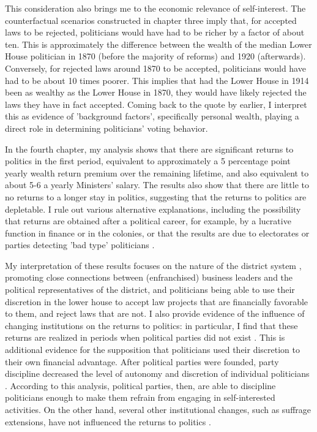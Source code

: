 This consideration also brings me to the economic relevance of self-interest. The counterfactual scenarios constructed in chapter three imply that, for accepted laws to be rejected, politicians would have had to be richer by a factor of about ten. This is approximately the difference between the wealth of the median Lower House politician in 1870 (before the majority of reforms) and 1920 (afterwards). Conversely, for rejected laws around 1870 to be accepted, politicians would have had to be about 10 times poorer. This implies that had the Lower House in 1914 been as wealthy as the Lower House in 1870, they would have likely rejected the laws they have in fact accepted. Coming back to the quote by \cite{van1983toegang} earlier, I interpret this as evidence of 'background factors', specifically personal wealth, playing a direct role in determining politicians' voting behavior. 

In the fourth chapter, my analysis shows that there are significant returns to politics in the first period, equivalent to approximately a 5 percentage point yearly wealth return premium over the remaining lifetime, and also equivalent to about 5-6 a yearly Ministers' salary. The results also show that there are little to no returns to a longer stay in politics, suggesting that the returns to politics are depletable. I rule out various alternative explanations, including the possibility that returns are obtained after a political career, for example, by a lucrative function in finance or in the colonies, or that the results are due to electorates or parties detecting 'bad type' politicians \citep{besley1995does}. 

My interpretation of these results focuses on the nature of the district system \citep{van2018tussen}, promoting close connections between (enfranchised) business leaders and the political representatives of the district, and politicians being able to use their discretion in the lower house to accept law projects that are financially favorable to them, and reject laws that are not. I also provide evidence of the influence of changing institutions on the returns to politics: in particular, I find that these returns are realized in periods when political parties did not exist \citep[cf.][]{eggers2009mps}. This is additional evidence for the supposition that politicians used their discretion to their own financial advantage. After political parties were founded, party discipline decreased the level of autonomy and discretion of individual politicians \citep{de2001antirevolutionaire,de2014ons}. According to this analysis, political parties, then, are able to discipline politicians enough to make them refrain from engaging in self-interested activities. On the other hand, several other institutional changes, such as suffrage extensions, have not influenced the returns to politics \citep[see also][]{ashworth2010does}. 


